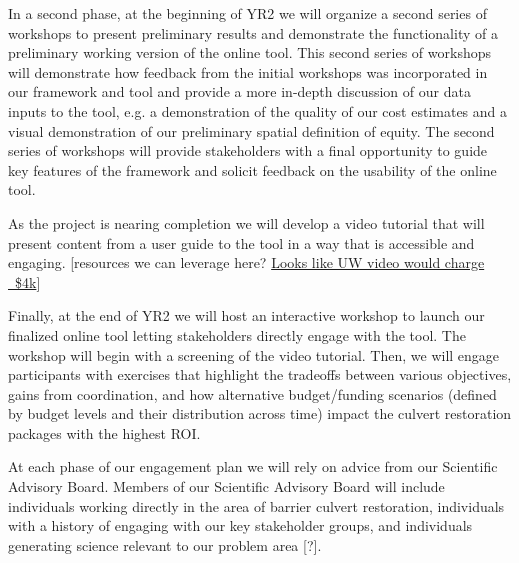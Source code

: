 \documentclass[12pt]{elsarticle}
\begin{document}
In a second phase, at the beginning of YR2 we will organize a second series of workshops to present preliminary results and demonstrate the functionality of a preliminary working version of the online tool. This second series of workshops will demonstrate how feedback from the initial workshops was incorporated in our framework and tool and provide a more in-depth discussion of our data inputs to the tool, e.g. a demonstration of the quality of our cost estimates and a visual demonstration of our preliminary spatial definition of equity. The second series of workshops will provide stakeholders with a final opportunity to guide key features of the framework and solicit feedback on the usability of the online tool.

As the project is nearing completion we will develop a video tutorial that will present content from a user guide to the tool in a way that is accessible and engaging. [resources we can leverage here? \href{https://www.washington.edu/video/our-services/examples-of-our-work/}{Looks like UW video would charge ~\$4k}]

Finally, at the end of YR2 we will host an interactive workshop to launch our finalized online tool letting stakeholders directly engage with the tool. The workshop will begin with a screening of the video tutorial. Then, we will engage participants with exercises that highlight the tradeoffs between various objectives, gains from coordination, and how alternative budget/funding scenarios (defined by budget levels and their distribution across time) impact the culvert restoration packages with the highest ROI. 

At each phase of our engagement plan we will rely on advice from our Scientific Advisory Board. Members of our Scientific Advisory Board will include individuals working directly in the area of barrier culvert restoration, individuals with a history of engaging with our key stakeholder groups, and individuals generating science relevant to our problem area [?]. 


\end{document}
